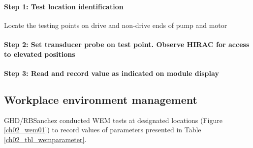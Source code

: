 \paragraph{Step 1: Test location identification}

Locate the testing points on drive and non-drive ends of pump and motor %


\paragraph{Step 2: Set transducer probe on test point. Observe HIRAC for access to elevated positions}
\paragraph{Step 3: Read and record value as indicated on module display}


\subsection{Workplace environment management}
\label{237}

GHD/RBSanchez conducted WEM tests at designated locations (Figure \ref{ch02_wem01}) to record values of parameters presented in Table \ref{ch02_tbl_wemparameter}.

